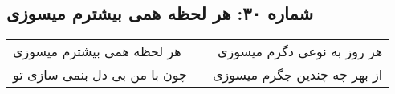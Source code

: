 \begin{center}
\section*{شماره ۳۰: هر لحظه همی بیشترم میسوزی}
\label{sec:030}
\begin{longtable}{l p{0.5cm} r}
هر لحظه همی بیشترم میسوزی
&&
هر روز به نوعی دگرم میسوزی
\\
چون با من بی دل بنمی سازی تو
&&
از بهر چه چندین جگرم میسوزی
\\
\end{longtable}
\end{center}
